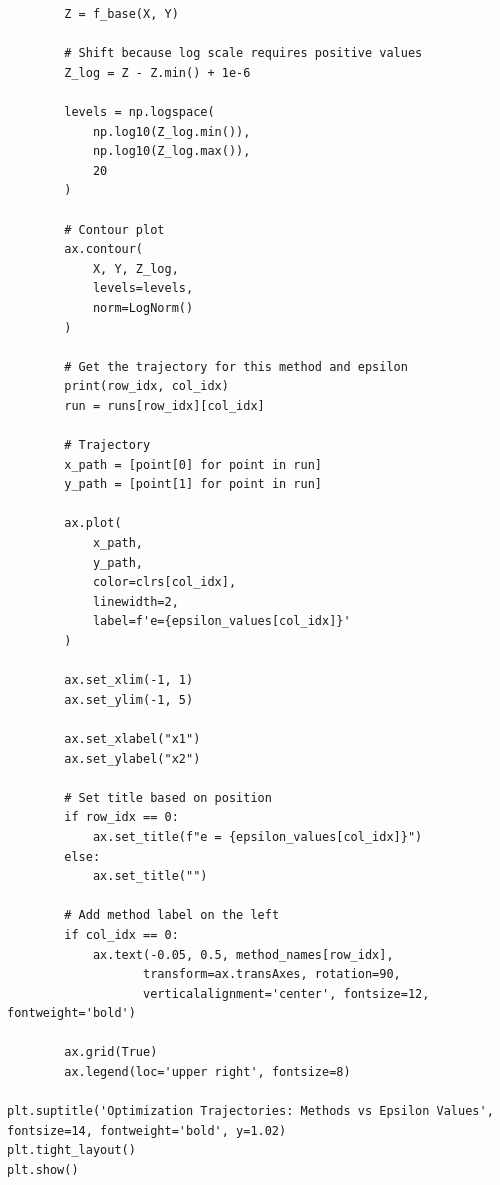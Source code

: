 \documentclass[12pt, letterpaper]{article}
\begin{document}
\begin{lstlisting}
        Z = f_base(X, Y)
        
        # Shift because log scale requires positive values
        Z_log = Z - Z.min() + 1e-6
        
        levels = np.logspace(
            np.log10(Z_log.min()),
            np.log10(Z_log.max()),
            20
        )
        
        # Contour plot
        ax.contour(
            X, Y, Z_log,
            levels=levels,
            norm=LogNorm()
        )
        
        # Get the trajectory for this method and epsilon
        print(row_idx, col_idx)
        run = runs[row_idx][col_idx]
        
        # Trajectory
        x_path = [point[0] for point in run]
        y_path = [point[1] for point in run]
        
        ax.plot(
            x_path,
            y_path,
            color=clrs[col_idx],
            linewidth=2,
            label=f'e={epsilon_values[col_idx]}'
        )
        
        ax.set_xlim(-1, 1)
        ax.set_ylim(-1, 5)
        
        ax.set_xlabel("x1")
        ax.set_ylabel("x2")
        
        # Set title based on position
        if row_idx == 0:
            ax.set_title(f"e = {epsilon_values[col_idx]}")
        else:
            ax.set_title("")
        
        # Add method label on the left
        if col_idx == 0:
            ax.text(-0.05, 0.5, method_names[row_idx], 
                   transform=ax.transAxes, rotation=90, 
                   verticalalignment='center', fontsize=12, fontweight='bold')
        
        ax.grid(True)
        ax.legend(loc='upper right', fontsize=8)

plt.suptitle('Optimization Trajectories: Methods vs Epsilon Values', fontsize=14, fontweight='bold', y=1.02)
plt.tight_layout()
plt.show()
\end{lstlisting}
\end{document}
